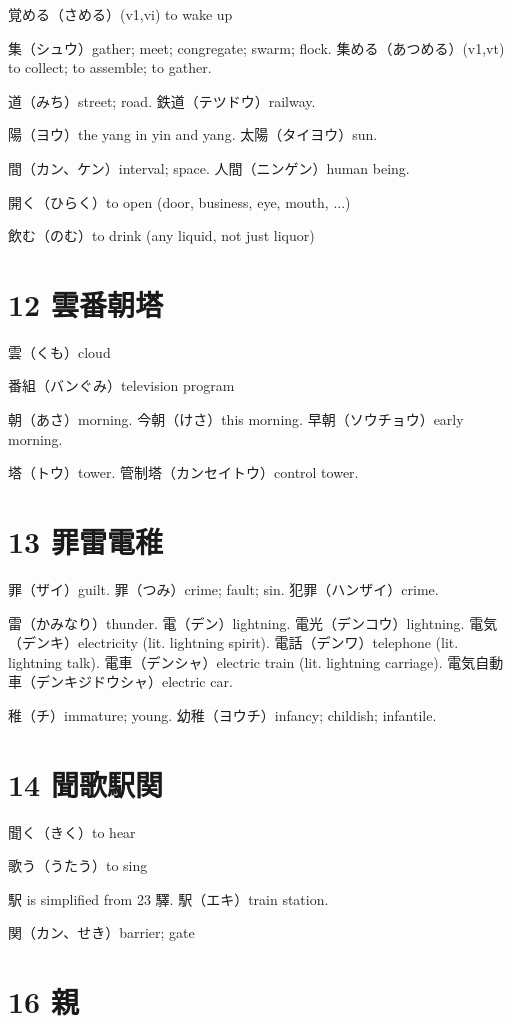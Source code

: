 覚める（さめる）(v1,vi) to wake up

集（シュウ）gather; meet; congregate; swarm; flock.
集める（あつめる）(v1,vt) to collect; to assemble; to gather.

道（みち）street; road.
鉄道（テツドウ）railway.

陽（ヨウ）the yang in yin and yang.
太陽（タイヨウ）sun.

間（カン、ケン）interval; space.
人間（ニンゲン）human being.

開く（ひらく）to open (door, business, eye, mouth, ...)

飲む（のむ）to drink (any liquid, not just liquor)

\section{12 雲番朝塔}

雲（くも）cloud

番組（バンぐみ）television program

朝（あさ）morning.
今朝（けさ）this morning.
早朝（ソウチョウ）early morning.

塔（トウ）tower.
管制塔（カンセイトウ）control tower.

\section{13 罪雷電稚}

罪（ザイ）guilt.
罪（つみ）crime; fault; sin.
犯罪（ハンザイ）crime.

雷（かみなり）thunder.
電（デン）lightning.
電光（デンコウ）lightning.
電気（デンキ）electricity (lit. lightning spirit).
電話（デンワ）telephone (lit. lightning talk).
電車（デンシャ）electric train (lit. lightning carriage).
電気自動車（デンキジドウシャ）electric car.

稚（チ）immature; young.
幼稚（ヨウチ）infancy; childish; infantile.

\section{14 聞歌駅関}

聞く（きく）to hear

歌う（うたう）to sing

駅 is simplified from 23 驛.
駅（エキ）train station.

関（カン、せき）barrier; gate

\section{16 親}

